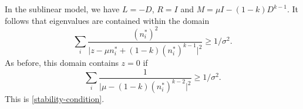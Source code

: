 \documentclass[12pt]{article}
\begin{document}
In the sublinear model, we have $L = -D$, $R = I$ and $M = \mu I - (1-k) D^{k-1}$. It follows that eigenvalues are contained within the domain
\begin{equation}
    \sum_{i} \frac{(n_i^*)^2}{\vert z -\mu n_i^* + (1-k) (n_i^*)^{k-1} \vert ^2}\geq 1/\sigma^2. 
\end{equation} 
As before, this domain contains $z=0$ if 
\begin{equation}
    \sum_{i} \frac{1}{\vert \mu - (1-k) (n_i^*)^{k-2} \vert ^2}\geq 1/\sigma^2. 
\end{equation} 
This is \eqref{stability-condition}. 


\printbibliography
\end{document}
